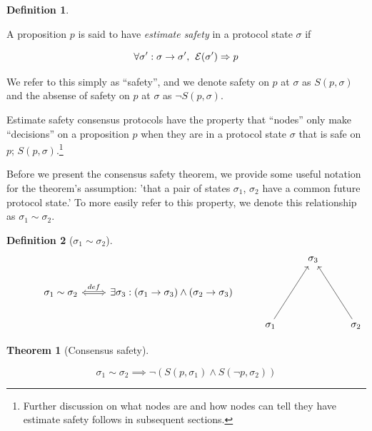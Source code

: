 \documentclass{article}
\theoremstyle{definition}
\newtheorem{thm}{Theorem}
\newtheorem{defn}{Definition}[section]
\begin{document}
\vspace{5mm}

\begin{defn}
\begin{description}
A proposition $p$ is said to have \emph{estimate safety} in a protocol state $\sigma$ if 

$$
\forall \sigma':\sigma \to \sigma',\hspace{1.5mm} \mathcal{E}(\sigma') \Rightarrow p
$$
\end{description}
\end{defn}

We refer to this simply as ``safety'', and we denote safety on $p$ at $\sigma$ as $S(p,\sigma)$ and the absense of safety on $p$ at $\sigma$ as $\neg{S(p,\sigma)}$.

Estimate safety consensus protocols have the property that ``nodes'' only make ``decisions'' on a proposition $p$ when they are in a protocol state $\sigma$ that is safe on $p$; $S(p,\sigma)$.\footnote{Further discussion on what nodes are and how nodes can tell they have estimate safety follows in subsequent sections.}

Before we present the consensus safety theorem, we provide some useful notation for the theorem's assumption: 'that a pair of states $\sigma_1$, $\sigma_2$ have a common future protocol state.' To more easily refer to this property, we denote this relationship as $\sigma_1 \sim \sigma_2$.

\begin{defn}[$\sigma_1 \sim \sigma_2$]
\begin{equation*}
\begin{tikzcd}
{}
  &
{}  
  &
{}  
  &
{}
  &
\sigma_3
  &
{}
  \\
{}
  &
\sigma_1 \sim \sigma_2
  \arrow[r,Leftrightarrow, "def"]
  &
\exists \sigma_3:(\sigma_1 \to \sigma_3) \land (\sigma_2 \to \sigma_3)
  &
{}  
  &
{}
  &
{}
  \\
{}  
  &
{}  
  &
{}
  &
\sigma_1
  \arrow[uur,""]
  &
{}
  &
\sigma_2
  \arrow[uul,""]
\end{tikzcd}
\end{equation*}
\end{defn}

\begin{thm}[Consensus safety]
\begin{description}
$$
\sigma_1 \sim \sigma_2 \implies \neg(S(p,\sigma_1) \land S(\neg{p},\sigma_2))
$$
\end{description}
\end{thm}
\end{document}
